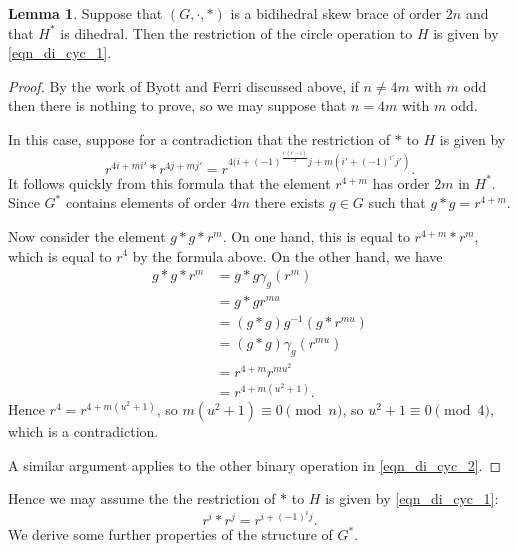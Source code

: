 \documentclass[reqno]{amsart}
\theoremstyle{definition}
\newtheorem{lemma}[theorem]{Lemma}
\begin{document}
\begin{lemma}
Suppose that $ (G,\cdot,\ast) $ is a bidihedral skew brace of order $ 2n $ and that $ H^{\ast} $ is dihedral. Then the restriction of the circle operation to $ H $ is given by \eqref{eqn_di_cyc_1}. 
\end{lemma}
\begin{proof}
By the work of Byott and Ferri discussed above, if $ n \neq 4m $ with $ m $ odd then there is nothing to prove, so we may suppose that $ n = 4m $ with $ m $ odd. 

In this case, suppose for a contradiction that the restriction of $ \ast $ to $ H $ is given by
\[ r^{4i+mi'} \ast r^{4j+mj'} = r^{4(i+(-1)^{\frac{i'(i' - 1)}{2}}j + m(i' + (-1)^{i'}j')}. \]
It follows quickly from this formula that the element $ r^{4+m} $ has order $ 2m $ in $ H^{\ast} $. Since $ G^{\ast} $ contains elements of order $ 4m $ there exists $ g \in G  $ such that $ g \ast g = r^{4+m} $. 

Now consider the element $ g \ast g \ast r^{m} $. On one hand, this is equal to $ r^{4+m} \ast r^{m} $, which is equal to $ r^{4} $ by the formula above. On the other hand, we have
\begin{align*}
g \ast g \ast r^{m} &= g \ast g\gamma_{g}(r^{m}) \\
& = g \ast gr^{mu} \tag{ for some $ u $ coprime to $ n $ } \\
&= (g \ast g) g^{-1}(g \ast r^{mu}) \\
&= (g \ast g) \gamma_{g}(r^{mu}) \\
&= r^{4+m} r^{mu^{2}} \\
&= r^{4+m(u^{2}+1)}.
\end{align*}
Hence $ r^{4} = r^{4+m(u^{2}+1)} $, so $ m(u^{2}+1) \equiv 0 \pmod{n} $, so $ u^{2}+1 \equiv 0 \pmod{4} $, which is a contradiction. 

A similar argument applies to the other binary operation in \eqref{eqn_di_cyc_2}. 
\end{proof}

Hence we may assume the the restriction of $ \ast $ to $ H $ is given by \eqref{eqn_di_cyc_1}:
\[ r^{i} \ast r^{j} = r^{i+(-1)^{i}j}.  \]
We derive some further properties of the structure of $ G^{\ast} $. 
\end{document}
